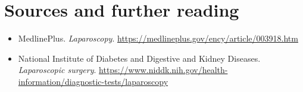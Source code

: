 \section*{Sources and further reading}
\begin{itemize}
\item MedlinePlus. \textit{Laparoscopy}. \url{https://medlineplus.gov/ency/article/003918.htm}
\item National Institute of Diabetes and Digestive and Kidney Diseases. \textit{Laparoscopic surgery}. \url{https://www.niddk.nih.gov/health-information/diagnostic-tests/laparoscopy}
\end{itemize}
